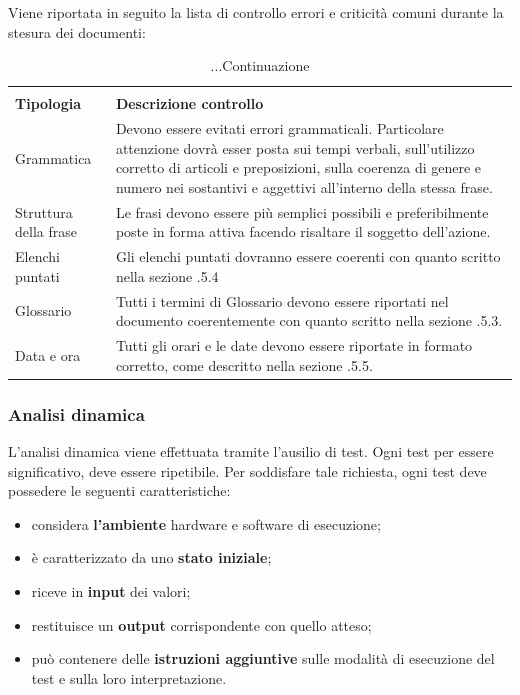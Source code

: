 \noindent Viene riportata in seguito la lista di controllo errori e criticità comuni durante la stesura dei documenti:

\renewcommand{\arraystretch}{2.2}

\begin{longtable}{|C{4cm}|C{8.5cm}|}
	\caption{Tabella per la lista di controllo}\\
	\textbf{Tipologia} & \textbf{Descrizione controllo}\\
	\endfirsthead
	
	\caption[]{...Continuazione}

	\endhead
	
	Grammatica & Devono essere evitati errori grammaticali. Particolare attenzione dovrà esser posta sui tempi verbali, sull'utilizzo corretto di articoli e preposizioni, sulla coerenza di genere e numero nei sostantivi e aggettivi all'interno della stessa frase. \\
	
	Struttura della frase & Le frasi devono essere più semplici possibili e preferibilmente poste in forma attiva facendo risaltare il soggetto dell'azione. \\
	
	Elenchi puntati & Gli elenchi puntati dovranno essere coerenti con quanto scritto nella sezione .5.4 \\
	
	Glossario & Tutti i termini di Glossario devono essere riportati nel documento coerentemente con quanto scritto nella sezione .5.3. \\
	
	Data e ora & Tutti gli orari e le date devono essere riportate in formato corretto, come descritto nella sezione .5.5. \\
	\hline
\end{longtable}



\subsubsection{Analisi dinamica}
L'analisi dinamica viene effettuata tramite l'ausilio di test. Ogni test per essere significativo, deve essere ripetibile. Per soddisfare tale richiesta, ogni test deve possedere le seguenti caratteristiche:
\begin{itemize}
	\item considera \textbf{l'ambiente} hardware e software di esecuzione;
	\item è caratterizzato da uno \textbf{stato iniziale};
	\item riceve in \textbf{input} dei valori;
	\item restituisce un \textbf{output} corrispondente con quello atteso;
	\item può contenere delle \textbf{istruzioni aggiuntive} sulle modalità di esecuzione del test e sulla loro interpretazione.
\end{itemize}

